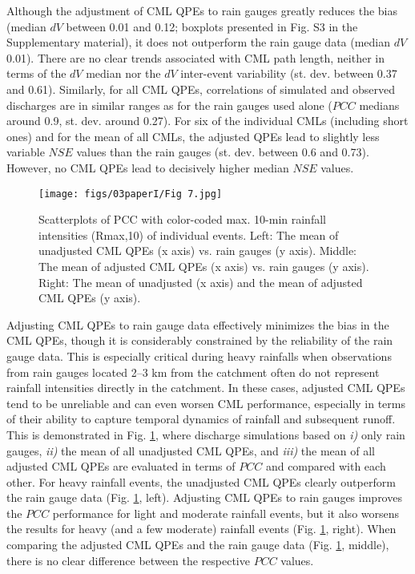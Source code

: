 \documentclass{ctuthesis}\usepackage[]{graphicx}\usepackage[]{color}
\begin{document}
Although the adjustment of CML QPEs to rain gauges greatly reduces the bias (median $dV$ between 0.01 and 0.12; boxplots presented in Fig. S3 in the Supplementary material), it does not outperform the rain gauge data (median $dV$ 0.01). There are no clear trends associated with CML path length, neither in terms of the $dV$ median nor the $dV$ inter-event variability (st. dev. between 0.37 and 0.61). Similarly, for all CML QPEs, correlations of simulated and observed discharges are in similar ranges as for the rain gauges used alone ($PCC$ medians around 0.9, st. dev. around 0.27). For six of the individual CMLs (including short ones) and for the mean of all CMLs, the adjusted QPEs lead to slightly less variable $NSE$ values than the rain gauges (st. dev. between 0.6 and 0.73). However, no CML QPEs lead to decisively higher median $NSE$ values.


\begin{figure}[h]
\begin{center}
\texttt{[image: figs/03paperI/Fig 7.jpg]}
\caption{Scatterplots of PCC with color-coded max. 10-min rainfall intensities (Rmax,10) of individual events. Left: The mean of unadjusted CML QPEs (x axis) vs. rain gauges (y axis). Middle: The mean of adjusted CML QPEs (x axis) vs. rain gauges (y axis). Right: The mean of unadjusted (x axis) and the mean of adjusted CML QPEs (y axis).} \label{3fig7}
\end{center}
\end{figure}

Adjusting CML QPEs to rain gauge data effectively minimizes the bias in the CML QPEs, though it is considerably constrained by the reliability of the rain gauge data. This is especially critical during heavy rainfalls when observations from rain gauges located 2--3 km from the catchment often do not represent rainfall intensities directly in the catchment. In these cases, adjusted CML QPEs tend to be unreliable and can even worsen CML performance, especially in terms of their ability to capture temporal dynamics of rainfall and subsequent runoff. This is demonstrated in Fig. \ref{3fig7}, where discharge simulations based on \emph{i)} only rain gauges, \emph{ii)} the mean of all unadjusted CML QPEs, and \emph{iii)} the mean of all adjusted CML QPEs are evaluated in terms of $PCC$ and compared with each other. For heavy rainfall events, the unadjusted CML QPEs clearly outperform the rain gauge data (Fig. \ref{3fig7}, left). Adjusting CML QPEs to rain gauges improves the $PCC$ performance for light and moderate rainfall events, but it also worsens the results for heavy (and a few moderate) rainfall events (Fig. \ref{3fig7}, right). When comparing the adjusted CML QPEs and the rain gauge data (Fig. \ref{3fig7}, middle), there is no clear difference between the respective $PCC$ values.
\end{document}
